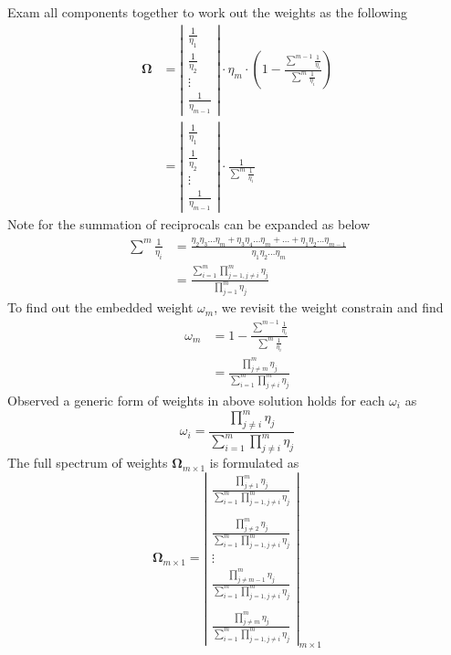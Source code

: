 \documentclass{article}
\begin{document}
Exam all components together to work out the weights as the following
\begin{align}
    \boldsymbol{\Omega} &= \left| \begin{matrix} \frac{1}{\eta_1} \\ \frac{1}{\eta_2} \\ \vdots \\ \frac{1}{\eta_{m - 1}} \end{matrix} \right| \cdot \eta_m \cdot \left(1 - \frac{\sum^{m - 1}{\frac{1}{\eta_i}}}{\sum^{m}{\frac{1}{\eta_i}}} \right) \nonumber \\
    &= \left| \begin{matrix} \frac{1}{\eta_1} \\ \frac{1}{\eta_2} \\ \vdots \\ \frac{1}{\eta_{m - 1}} \end{matrix} \right| \cdot \frac{1}{\sum^{m}{\frac{1}{\eta_i}}}
\end{align}
Note for the summation of reciprocals can be expanded as below
\begin{align}
    \sum^{m}{\frac{1}{\eta_i}} &= \frac{\eta_2 \eta_3 \dots \eta_m + \eta_3 \eta_4 \dots \eta_m + \dots + \eta_1 \eta_2 \dots \eta_{m - 1}}{\eta_1 \eta_2 \dots \eta_m} \nonumber \\
     &= \frac{\sum_{i = 1}^{m}{\prod_{j = 1, j \neq i}^{m}{\eta_j}}}{\prod^{m}_{j = 1}{\eta_j}}
\end{align}
To find out the embedded weight $ \omega_m $, we revisit the weight constrain and find
\begin{align}
    \omega_m &= 1 - \frac{\sum^{m - 1}{\frac{1}{\eta_i}}}{\sum^{m}{\frac{1}{\eta_i}}} \nonumber \\
    &= \frac{\prod^{m}_{j \neq m}{\eta_j}}{\sum^{m}_{i=1}{\prod^{m}_{j \neq i}{\eta_j}}}
\end{align}
Observed a generic form of weights in above solution holds for each $ \omega_i $ as 
\begin{equation}
    \omega_i = \frac{\prod^{m}_{j \neq i}{\eta_j}}{\sum^{m}_{i = 1}{\prod^{m}_{j \neq i}{\eta_j}}}
\end{equation}
The full spectrum of weights $ \boldsymbol{\Omega}_{m \times 1} $ is formulated as
\begin{equation}
    \boldsymbol{\Omega}_{m \times 1} = \left| \begin{matrix} \frac{\prod_{j \neq 1}^{m}{\eta_j}}{\sum_{i = 1}^{m}{\prod_{j = 1, j \neq i}^{m}{\eta_j}}} \\ \\ \frac{\prod_{j \neq 2}^{m}{\eta_j}}{\sum_{i = 1}^{m}{\prod_{j = 1, j \neq i}^{m}{\eta_j}}} \\ \vdots \\ \frac{\prod_{j \neq m - 1}^{m}{\eta_j}}{\sum_{i = 1}^{m}{\prod_{j = 1, j \neq i}^{m}{\eta_j}}} \\ \\ \frac{\prod_{j \neq m}^{m}{\eta_j}}{\sum_{i = 1}^{m}{\prod_{j = 1, j \neq i}^{m}{\eta_j}}} \end{matrix} \right|_{m \times 1}
\end{equation}
\end{document}
